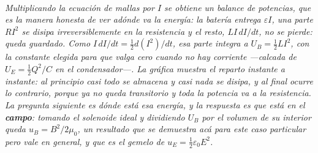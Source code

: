 \begin{center}
\begin{tikzpicture}[scale=1]
\end{tikzpicture}\\[0.5em]
{\small\itshape Multiplicando la ecuación de mallas por $I$ se obtiene un
balance de potencias, que es la manera honesta de ver adónde va la energía: la
batería entrega $\varepsilon I$, una parte $RI^2$ se disipa irreversiblemente en
la resistencia y el resto, $LI\,dI/dt$, no se pierde: queda \emph{guardado}.
Como $I\,dI/dt = \tfrac12 d(I^2)/dt$, esa parte integra a
$U_B = \tfrac12 L I^2$, con la constante elegida para que valga cero cuando no
hay corriente ---calcada de $U_E = \tfrac12 Q^2/C$ en el condensador---. La
gráfica muestra el reparto instante a instante: al principio casi todo se
almacena y casi nada se disipa, y al final ocurre lo contrario, porque ya no
queda transitorio y toda la potencia va a la resistencia. La pregunta siguiente
es dónde está esa energía, y la respuesta es que está en el \textbf{campo}:
tomando el solenoide ideal y dividiendo $U_B$ por el volumen de su interior
queda $u_B = B^2/2\mu_0$, un resultado que se demuestra acá para este caso
particular pero vale en general, y que es el gemelo de
$u_E = \tfrac12\varepsilon_0 E^2$.}
\end{center}
